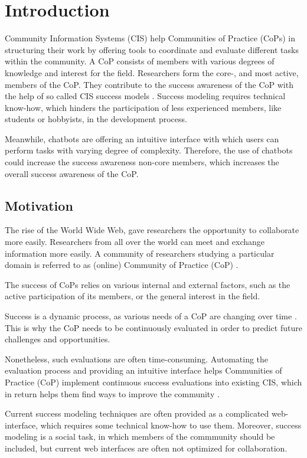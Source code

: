 \chapter{Introduction}
Community Information Systems (CIS) help Communities of Practice (CoPs) in structuring their work by offering tools to coordinate and evaluate different tasks within the community.
A CoP consists of members with various degrees of knowledge and interest for the field.
Researchers form the core-, and most active, members of the CoP.
They contribute to the success awareness of the CoP with the help of so called CIS success models \cite{Klam10c}.
Success modeling requires technical know-how, which hinders the participation of less experienced members, like students or hobbyists, in the development process.

Meanwhile, chatbots are offering an intuitive interface with which users can perform tasks with varying degree of complexity. Therefore, the use of chatbots could increase the success awareness non-core members, which increases the overall success awareness of the CoP.

\section{Motivation}
The rise of the World Wide Web, gave researchers the opportunity to collaborate more easily. Researchers from all over the world can meet and exchange information more easily. A community of researchers studying a particular domain is referred to as (online) Community of Practice (CoP) \cite{Renz08}.

The success of CoPs relies on various internal and external factors, such as the active participation of its members, or the general interest in the field.

Success is a dynamic process, as various needs of a CoP are changing over time \cite{Renz08,GKJa08}.
This is why the CoP needs to be continuously evaluated in order to predict future challenges and opportunities.

Nonetheless, such evaluations are often time-consuming. Automating the evaluation process and providing an intuitive interface helps Communities of Practice (CoP) implement continuous success evaluations into  existing CIS, which in return helps them find ways to improve the community \cite{Renz08}.

Current success modeling techniques are often provided as a complicated web-interface, which requires some technical know-how to use them.
Moreover, success modeling is a social task, in which members of the commmunity should be included, but current web interfaces are often not optimized for collaboration.

